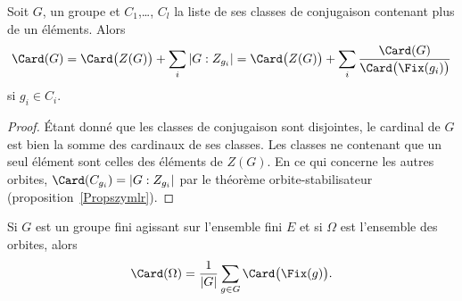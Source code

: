 \begin{corollary}
    Soit \( G\), un groupe et \( C_1\),\ldots, \( C_l\) la liste de ses classes de conjugaison contenant plus de un éléments. Alors
    \begin{equation}        \label{EqkgGmoq}
        \Card(G)=\Card\big( Z(G) \big)+\sum_i| G:Z_{g_i} |=\Card\big( Z(G) \big)+\sum_i\frac{ \Card(G) }{ \Card\big( \Fix(g_i) \big) }
    \end{equation}
    si \( g_i\in C_i\).
\end{corollary}

\begin{proof}
    Étant donné que les classes de conjugaison sont disjointes, le cardinal de \( G\) est bien la somme des cardinaux de ses classes. Les classes ne contenant que un seul élément sont celles des éléments de \( Z(G)\). En ce qui concerne les autres orbites, \( \Card(C_{g_i})=| G:Z_{g_i} |\) par le théorème orbite-stabilisateur (proposition~\ref{Propszymlr}).
\end{proof}

\begin{theorem}      \label{THOooEFDMooDfosOw}
    Si \( G\) est un groupe fini agissant sur l'ensemble fini \( E\) et si \( \Omega\) est l'ensemble des orbites, alors
    \begin{equation}    \label{EqTUsblv}
        \Card(\Omega)=\frac{1}{ | G | }\sum_{g\in G}\Card\big( \Fix(g) \big).
    \end{equation}
\end{theorem}

